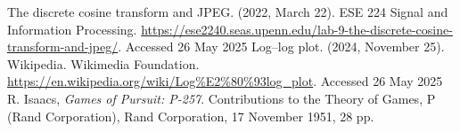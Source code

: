\documentclass[11pt]{article}
\begin{document}
              \begin{thebibliography}{99}
                 The discrete cosine transform and JPEG. (2022, March 22). ESE 224 Signal and Information Processing. \url{https://ese2240.seas.upenn.edu/lab-9-the-discrete-cosine-transform-and-jpeg/}. Accessed 26 May 2025
                 Log–log plot. (2024, November 25). Wikipedia. Wikimedia Foundation. \url{https://en.wikipedia.org/wiki/Log%E2%80%93log_plot}. Accessed 26 May 2025
                   R. Isaacs, \emph{Games of Pursuit: P-257}. Contributions to the Theory of Games, P (Rand Corporation), Rand Corporation, 17 November 1951, 28 pp.
                \end{thebibliography}

                
\end{document}
